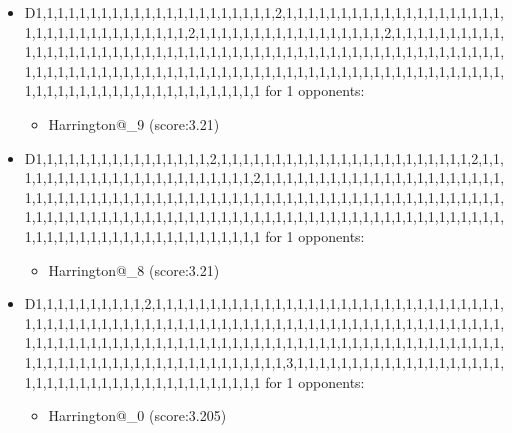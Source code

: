 \begin{appendices}
\begin{itemize}
        \item D1,1,1,1,1,1,1,1,1,1,1,1,1,1,1,1,1,1,1,1,1,1,2,1,1,1,1,1,1,1,1,1,1,1,1,1,1,1,1,1,1,1,1,1,1,1,1,1,1,1,1,1,1,1,1,1,1,1,2,1,1,1,1,1,1,1,1,1,1,1,1,1,1,1,1,1,2,1,1,1,1,1,1,1,1,1,1,1,1,1,1,1,1,1,1,1,1,1,1,1,1,1,1,1,1,1,1,1,1,1,1,1,1,1,1,1,1,1,1,1,1,1,1,1,1,1,1,1,1,1,1,1,1,1,1,1,1,1,1,1,1,1,1,1,1,1,1,1,1,1,1,1,1,1,1,1,1,1,1,1,1,1,1,1,1,1,1,1,1,1,1,1,1,1,1,1,1,1,1,1,1,1,1,1,1,1,1,1,1,1,1,1,1,1,1,1,1 for 1 opponents:
        \begin{multicols}{3}
            \begin{itemize}
                \item Harrington@\_9 (score:3.21)
            \end{itemize}
        \end{multicols}

        \item D1,1,1,1,1,1,1,1,1,1,1,1,1,1,1,1,2,1,1,1,1,1,1,1,1,1,1,1,1,1,1,1,1,1,1,1,1,1,1,1,2,1,1,1,1,1,1,1,1,1,1,1,1,1,1,1,1,1,1,1,1,1,1,1,2,1,1,1,1,1,1,1,1,1,1,1,1,1,1,1,1,1,1,1,1,1,1,1,1,1,1,1,1,1,1,1,1,1,1,1,1,1,1,1,1,1,1,1,1,1,1,1,1,1,1,1,1,1,1,1,1,1,1,1,1,1,1,1,1,1,1,1,1,1,1,1,1,1,1,1,1,1,1,1,1,1,1,1,1,1,1,1,1,1,1,1,1,1,1,1,1,1,1,1,1,1,1,1,1,1,1,1,1,1,1,1,1,1,1,1,1,1,1,1,1,1,1,1,1,1,1,1,1,1,1,1,1 for 1 opponents:
        \begin{multicols}{3}
            \begin{itemize}
                \item Harrington@\_8 (score:3.21)
            \end{itemize}
        \end{multicols}

        \item D1,1,1,1,1,1,1,1,1,1,2,1,1,1,1,1,1,1,1,1,1,1,1,1,1,1,1,1,1,1,1,1,1,1,1,1,1,1,1,1,1,1,1,1,1,1,1,1,1,1,1,1,1,1,1,1,1,1,1,1,1,1,1,1,1,1,1,1,1,1,1,1,1,1,1,1,1,1,1,1,1,1,1,1,1,1,1,1,1,1,1,1,1,1,1,1,1,1,1,1,1,1,1,1,1,1,1,1,1,1,1,1,1,1,1,1,1,1,1,1,1,1,1,1,1,1,1,1,1,1,1,1,1,1,1,1,1,1,1,1,1,1,1,1,1,1,1,1,1,1,1,1,1,1,1,3,1,1,1,1,1,1,1,1,1,1,1,1,1,1,1,1,1,1,1,1,1,1,1,1,1,1,1,1,1,1,1,1,1,1,1,1,1,1,1,1,1 for 1 opponents:
        \begin{multicols}{3}
            \begin{itemize}
                \item Harrington@\_0 (score:3.205)
            \end{itemize}
        \end{multicols}


\end{itemize}
\end{appendices}
